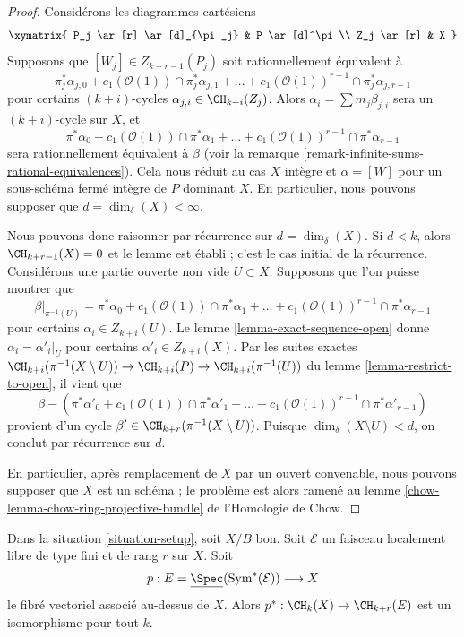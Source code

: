 \begin{proof}
\medskip\noindent
Considérons les diagrammes cartésiens
$$
\xymatrix{
P_j \ar[r] \ar[d]_{\pi_j} & P \ar[d]^\pi \\
Z_j \ar[r] & X
}
$$
Supposons que $[W_j] \in Z_{k + r - 1}(P_j)$ soit rationnellement équivalent à
$$
\pi_j^*\alpha_{j, 0} +
c_1(\mathcal{O}(1)) \cap \pi_j^*\alpha_{j, 1} +
\ldots +
c_1(\mathcal{O}(1))^{r - 1} \cap \pi_j^*\alpha_{j, r - 1}
$$
pour certains $(k + i)$-cycles $\alpha_{j, i} \in \CH_{k + i}(Z_j)$. Alors
$\alpha_i = \sum m_j \beta_{j, i}$ sera un $(k + i)$-cycle sur $X$, et
$$
\pi^*\alpha_0 +
c_1(\mathcal{O}(1)) \cap \pi^*\alpha_1 +
\ldots +
c_1(\mathcal{O}(1))^{r - 1} \cap \pi^*\alpha_{r - 1}
$$
sera rationnellement équivalent à $\beta$ (voir la remarque
\ref{remark-infinite-sums-rational-equivalences}). Cela nous réduit au cas $X$
intègre et $\alpha = [W]$ pour un sous-schéma fermé intègre de $P$ dominant
$X$. En particulier, nous pouvons supposer que $d = \dim_\delta(X) < \infty$.

\medskip\noindent
Nous pouvons donc raisonner par récurrence sur $d = \dim_\delta(X)$. Si $d <
k$, alors $\CH_{k + r - 1}(X) = 0$ et le lemme est établi ; c'est le cas
initial de la récurrence. Considérons une partie ouverte non vide $U \subset
X$. Supposons que
l'on puisse montrer que
$$
\beta|_{\pi^{-1}(U)} =
\pi^*\alpha_0 +
c_1(\mathcal{O}(1)) \cap \pi^*\alpha_1 +
\ldots +
c_1(\mathcal{O}(1))^{r - 1} \cap \pi^*\alpha_{r - 1}
$$
pour certains $\alpha_i \in Z_{k + i}(U)$. Le lemme
\ref{lemma-exact-sequence-open} donne $\alpha_i = \alpha'_i|_U$ pour certains
$\alpha'_i \in Z_{k + i}(X)$. Par les suites exactes $\CH_{k +
i}(\pi^{-1}(X \setminus U)) \to \CH_{k + i}(P) \to \CH_{k + i}(\pi^{-1}(U))$
du lemme \ref{lemma-restrict-to-open}, il vient que
$$
\beta -
\left(\pi^*\alpha'_0 +
c_1(\mathcal{O}(1)) \cap \pi^*\alpha'_1 +
\ldots +
c_1(\mathcal{O}(1))^{r - 1} \cap \pi^*\alpha'_{r - 1}\right)
$$
provient d'un cycle $\beta' \in \CH_{k + r}(\pi^{-1}(X \setminus U))$. Puisque
$\dim_\delta(X \setminus U) < d$, on conclut par récurrence sur $d$.

\medskip\noindent
En particulier, après remplacement de $X$ par un ouvert convenable, nous
pouvons supposer que $X$ est un schéma ; le problème est alors ramené au lemme
\ref{chow-lemma-chow-ring-projective-bundle} de l'Homologie de Chow.
\end{proof}

\begin{lemma}
\label{lemma-vectorbundle}
Dans la situation \ref{situation-setup}, soit $X/B$ bon. Soit $\mathcal{E}$ un
faisceau localement libre de type fini et de rang $r$ sur $X$. Soit
$$
p :
E = \underline{\Spec}(\text{Sym}^*(\mathcal{E}))
\longrightarrow
X
$$
le fibré vectoriel associé au-dessus de $X$. Alors $p^* : \CH_k(X) \to
\CH_{k + r}(E)$ est un isomorphisme pour tout $k$.
\end{lemma}

